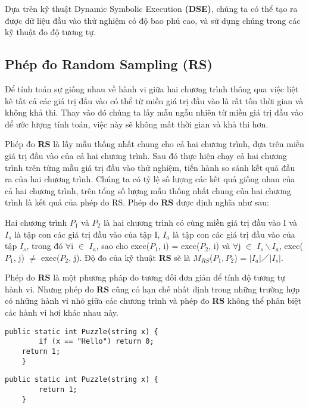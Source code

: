 Dựa trên kỹ thuật Dynamic Symbolic Execution \textbf{(DSE)}, chúng ta có thể tạo ra được dữ liệu đầu vào thử nghiệm có độ bao phủ cao, và sử dụng chúng trong các kỹ thuật đo độ tương tự.

\subsection{Phép đo Random Sampling (RS)}
Để tính toán sự giống nhau về hành vi giữa hai chương trình thông qua việc liệt kê tất cả các giá trị đầu vào có thể từ miền giá trị đầu vào là rất tốn thời gian và không khả thi. Thay vào đó chúng ta lấy mẫu ngẫu nhiên từ miền giá trị đầu vào để ước lượng tính toán, việc này sẽ không mất thời gian và khả thi hơn.

Phép đo \textbf{RS} là lấy mẫu thống nhất chung cho cả hai chương trình, dựa trên miền giá trị đầu vào của cả hai chương trình. Sau đó thực hiện chạy cả hai chương trình trên từng mẫu giá trị đầu vào thử nghiệm, tiến hành so sánh kết quả đầu ra của hai chương trình. Chúng ta có tỷ lệ số lượng các kết quả giống nhau của cả hai chương trình, trên tổng số lượng mẫu thống nhất chung của hai chương trình là kết quả của phép đo RS. Phép đo \textbf{RS} được định nghĩa như sau:
 
\begin{definition}
  Hai chương trình $P_{1}$ và $P_{2}$ là hai chương trình có cùng miền
  giá trị đầu vào I và $I_{s}$ là tập con các giá trị đầu vào của tập
  I, $I_{a}$ là tập con các giá trị đầu vào của tập $I_{s}$, trong
  đó $\forall$i $\in$ $I_{a}$, sao cho exec($P_{1}$, i) =
  exec($P_{2}$, i) và $\forall$j $\in$ $I_{s} \backslash I_{a}$,
  exec($P_{1}$, j) $\neq$ exec($P_{2}$, j). Độ đo của kỹ thuật \textbf{RS}
  sẽ là $M_{RS}$($P_{1},P_{2}$) =
  $\left|I_{a}\right|$$\diagup$$\left|I_{s}\right|$.
\end{definition}

Phép đo \textbf{RS} là một phương pháp đo tương đối đơn giản để tính độ tương tự hành vi. Nhưng phép đo \textbf{RS} cũng có hạn chế nhất định trong những trường hợp có những hành vi nhỏ giữa các chương trình và phép đo \textbf{RS } không thể phân biệt các hành vi hơi khác nhau này.

\begin{lstlisting}[caption={Chương trình $P_{1}$}, label={Script}]
	public static int Puzzle(string x) {
		if (x == "Hello") return 0;		
	return 1;
	}
\end{lstlisting}

	
\begin{lstlisting}[caption={Chương trình $P_{2}$}, label={Script}]
	public static int Puzzle(string x) {
		return 1;
	}
\end{lstlisting}
	

